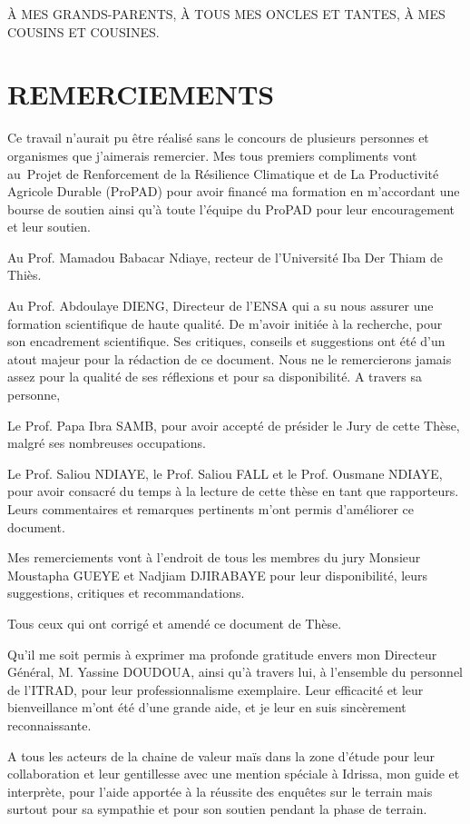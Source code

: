 \documentclass[12pt,oneside]{report}
\begin{document}
À MES GRANDS-PARENTS, À TOUS MES ONCLES ET TANTES, À MES COUSINS ET COUSINES.

\chapter{REMERCIEMENTS}
Ce travail n’aurait pu être réalisé sans le concours de plusieurs personnes et organismes que j’aimerais remercier. Mes tous premiers compliments vont au Projet de Renforcement de la Résilience Climatique et de La Productivité Agricole Durable (ProPAD) pour avoir financé ma formation en m’accordant une bourse de soutien ainsi qu’à toute l’équipe du ProPAD pour leur encouragement et leur soutien.

Au Prof. Mamadou Babacar Ndiaye, recteur de l’Université Iba Der Thiam de Thiès.

Au Prof. Abdoulaye DIENG, Directeur de l’ENSA qui a su nous assurer une formation scientifique de haute qualité. De m’avoir initiée à la recherche, pour son encadrement scientifique. Ses critiques, conseils et suggestions ont été d’un atout majeur pour la rédaction de ce document. Nous ne le remercierons jamais assez pour la qualité de ses réflexions et pour sa disponibilité.  A travers sa personne,

Le Prof. Papa Ibra SAMB, pour avoir accepté de présider le Jury de cette Thèse, malgré ses nombreuses occupations.

Le Prof.  Saliou NDIAYE, le Prof. Saliou FALL et le Prof. Ousmane NDIAYE, pour avoir consacré du temps à la lecture de cette thèse en tant que rapporteurs. Leurs commentaires et remarques pertinents m’ont permis d’améliorer ce document.

Mes remerciements vont à l'endroit de tous les membres du jury Monsieur Moustapha GUEYE et Nadjiam DJIRABAYE pour leur disponibilité, leurs suggestions, critiques et recommandations.

Tous ceux qui ont corrigé et amendé ce document de Thèse.

Qu’il me soit permis à exprimer ma profonde gratitude envers mon Directeur Général, M. Yassine DOUDOUA, ainsi qu'à travers lui, à l'ensemble du personnel de l'ITRAD, pour leur professionnalisme exemplaire. Leur efficacité et leur bienveillance m'ont été d'une grande aide, et je leur en suis sincèrement reconnaissante.

A tous les acteurs de la chaine de valeur maïs dans la zone d’étude pour leur collaboration et leur gentillesse avec une mention spéciale à Idrissa, mon guide et interprète, pour l’aide apportée à la réussite des enquêtes sur le terrain mais surtout pour sa sympathie et pour son soutien pendant la phase de terrain.
\end{document}
